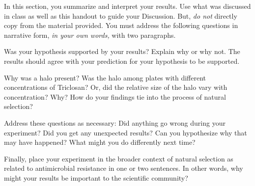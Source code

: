\documentclass[12pt]{exam}
\begin{document}
In this section, you summarize and interpret your results. Use what
was discussed in class as well as this handout to guide
your Discussion. But, \emph{do not} directly copy from the material provided.
You must address the following questions in narrative form, \emph{in your own words,} with two
paragraphs.

Was your hypothesis supported by your results? Explain why or why not. 
The results should agree with your prediction for your hypothesis to be supported. 

Why was a halo present? Was the halo among plates with different
concentrations of Triclosan? Or, did the relative size of the halo vary
with concentration? Why? How do your findings tie into the
process of natural selection?

Address these questions as necessary: Did anything go wrong during your
experiment? Did you get any unexpected results? Can you hypothesize
why that may have happened? What might you do differently next time?

Finally, place your experiment in the broader context of natural
selection as related to antimicrobial resistance in one or two
sentences. In other words, why might your results be important to the
scientific community?




	


%
%
%
%

\end{document}
